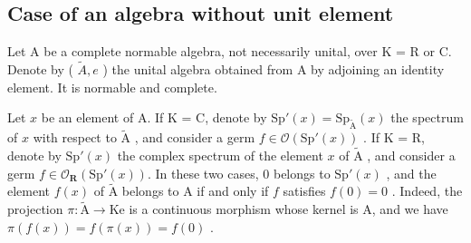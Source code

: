 \subsection{Case of an algebra without unit element}

Let A be a complete normable algebra, not necessarily unital, over K = R or C. Denote by ( \(\widetilde{A}, e\) ) the unital algebra obtained from A by adjoining an identity element. It is normable and complete.

Let \(x\) be an element of A. If K = C, denote by \(\mathrm{Sp}'(x) = \mathrm{Sp}_{\widetilde{\mathrm{A}}} (x)\) the spectrum of \(x\) with respect to \(\widetilde{\mathrm{A}}\) , and consider a germ \(f \in \mathcal{O}(\mathrm{Sp}'(x))\) . If K = R, denote by \(\mathrm{Sp}'(x)\) the complex spectrum of the element \(x\) of \(\widetilde{\mathrm{A}}\) , and consider a germ \(f \in \mathcal{O}_{\mathbf{R}}(\mathrm{Sp}'(x))\). In these two cases, 0 belongs to \(\mathrm{Sp}'(x)\) , and the element \(f(x)\) of \(\widetilde{\mathrm{A}}\) belongs to A if and only if \(f\) satisfies \(f(0) = 0\) . Indeed, the projection \(\pi: \widetilde{\mathrm{A}} \to \mathrm{Ke}\) is a continuous morphism whose kernel is A, and we have \(\pi(f(x)) = f(\pi(x)) = f(0)\) .

